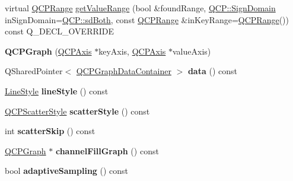 \begin{DoxyCompactItemize}
\item 
virtual \hyperlink{class_q_c_p_range}{Q\+C\+P\+Range} \hyperlink{class_q_c_p_graph_a8f773e56f191a61c06e129e90a604d77}{get\+Value\+Range} (bool \&found\+Range, \hyperlink{namespace_q_c_p_afd50e7cf431af385614987d8553ff8a9}{Q\+C\+P\+::\+Sign\+Domain} in\+Sign\+Domain=\hyperlink{namespace_q_c_p_afd50e7cf431af385614987d8553ff8a9a3dee7e9cd2fedce9253b83e172626a6c}{Q\+C\+P\+::sd\+Both}, const \hyperlink{class_q_c_p_range}{Q\+C\+P\+Range} \&in\+Key\+Range=\hyperlink{class_q_c_p_range}{Q\+C\+P\+Range}()) const Q\+\_\+\+D\+E\+C\+L\+\_\+\+O\+V\+E\+R\+R\+I\+DE
\item 
{\bfseries Q\+C\+P\+Graph} (\hyperlink{class_q_c_p_axis}{Q\+C\+P\+Axis} $\ast$key\+Axis, \hyperlink{class_q_c_p_axis}{Q\+C\+P\+Axis} $\ast$value\+Axis)\hypertarget{class_q_c_p_graph_a0393a38cf7183cbf46348eb6cf9a5a6c}{}\label{class_q_c_p_graph_a0393a38cf7183cbf46348eb6cf9a5a6c}

\item 
Q\+Shared\+Pointer$<$ \hyperlink{class_q_c_p_data_container}{Q\+C\+P\+Graph\+Data\+Container} $>$ {\bfseries data} () const \hypertarget{class_q_c_p_graph_abd2fa4f710fa950b1834bf24e66efc9a}{}\label{class_q_c_p_graph_abd2fa4f710fa950b1834bf24e66efc9a}

\item 
\hyperlink{class_q_c_p_graph_ad60175cd9b5cac937c5ee685c32c0859}{Line\+Style} {\bfseries line\+Style} () const \hypertarget{class_q_c_p_graph_ad6db8d31abeac256a285fc68d6b9b9be}{}\label{class_q_c_p_graph_ad6db8d31abeac256a285fc68d6b9b9be}

\item 
\hyperlink{class_q_c_p_scatter_style}{Q\+C\+P\+Scatter\+Style} {\bfseries scatter\+Style} () const \hypertarget{class_q_c_p_graph_ae0227c79f4e42a350c2c99fb2fb879db}{}\label{class_q_c_p_graph_ae0227c79f4e42a350c2c99fb2fb879db}

\item 
int {\bfseries scatter\+Skip} () const \hypertarget{class_q_c_p_graph_ae82c8427471bf68ccae960dfea6f30bd}{}\label{class_q_c_p_graph_ae82c8427471bf68ccae960dfea6f30bd}

\item 
\hyperlink{class_q_c_p_graph}{Q\+C\+P\+Graph} $\ast$ {\bfseries channel\+Fill\+Graph} () const \hypertarget{class_q_c_p_graph_a5369f23863e04a6164f8b66d49fd18f4}{}\label{class_q_c_p_graph_a5369f23863e04a6164f8b66d49fd18f4}

\item 
bool {\bfseries adaptive\+Sampling} () const \hypertarget{class_q_c_p_graph_ad3bea28ec910eedfa9b788928d610de0}{}\label{class_q_c_p_graph_ad3bea28ec910eedfa9b788928d610de0}


\end{DoxyCompactItemize}
